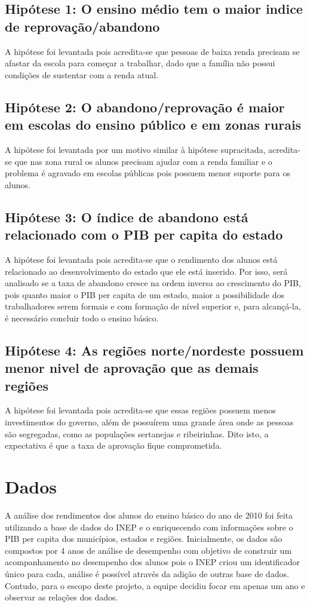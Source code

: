 \documentclass[review]{elsarticle}
\begin{document}
\subsection{Hipótese 1: O ensino médio tem o maior indice de reprovação/abandono}
A hipótese foi levantada pois acredita-se que pessoas de baixa renda precisam se afastar da escola para começar a trabalhar, dado que a família não possui condições de sustentar com a renda atual.\par

\subsection{Hipótese 2: O abandono/reprovação é maior em escolas do ensino público e em zonas rurais}
A hipótese foi levantada por um motivo similar à hipótese supracitada, acredita-se que nas zona rural os alunos precisam ajudar com a renda familiar e o problema é agravado em escolas públicas pois possuem menor suporte para os alunos.\par

\subsection{Hipótese 3: O índice de abandono está relacionado com o PIB per capita do estado}
A hipótese foi levantada pois acredita-se que o rendimento dos alunos está relacionado ao desenvolvimento do estado que ele está inserido. Por isso, será analisado se a taxa de abandono cresce na ordem inversa ao crescimento do PIB, pois quanto maior o PIB per capita de um estado, maior a possibilidade dos trabalhadores serem formais e com formação de nível superior e, para alcançá-la, é necessário concluir todo o ensino básico.\par

\subsection{Hipótese 4: As regiões norte/nordeste possuem menor nivel de aprovação que as demais regiões}
A hipótese foi levantada pois acredita-se que essas regiões possuem menos investimentos do governo, além de possuírem uma grande área onde as pessoas são segregadas, como as populações sertanejas e ribeirinhas. Dito isto, a expectativa é que a taxa de aprovação fique comprometida.\par

\section{Dados}
A análise dos rendimentos dos alunos do ensino básico do ano de 2010 foi feita utilizando a base de dados do INEP e o enriquecendo com informações sobre o PIB per capita dos municípios, estados e regiões. Inicialmente, os dados são compostos por 4 anos de análise de desempenho com objetivo de construir um acompanhamento no desempenho dos alunos pois o INEP criou um identificador único para cada, análise é possível através da adição de outras base de dados. Contudo, para o escopo deste projeto, a equipe decidiu focar em apenas um ano e observar as relações dos dados.\par
\end{document}
